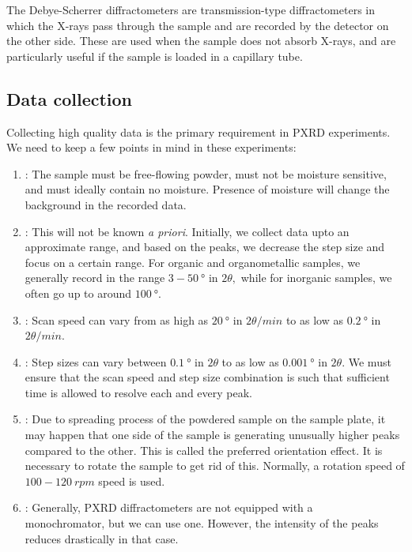 	The Debye-Scherrer diffractometers are transmission-type diffractometers in which the X-rays pass through the sample and are recorded by the detector on the other side. These are used when the sample does not absorb X-rays, and are particularly useful if the sample is loaded in a capillary tube.
	
\subsection{Data collection}

	Collecting high quality data is the primary requirement in PXRD experiments. We need to keep a few points in mind in these experiments:%
%		
		\begin{enumerate}%
%		
		    \item {}: The sample must be free-flowing powder, must not be moisture sensitive, and must ideally contain no moisture. Presence of moisture will change the background in the recorded data.
		    
		    \item {}: This will not be known \textit{a priori}. Initially, we collect data upto an approximate range, and based on the peaks, we decrease the step size and focus on a certain range. For organic and organometallic samples, we generally record in the range $3-50~\si{\degree}$ in $2\theta,$ while for inorganic samples, we often go up to around $\SI{100}{\degree}.$
		    
		    \item {}: Scan speed can vary from as high as $\SI{20}{\degree}$ in $\si{2\theta \per min}$ to as low as $\SI{0.2}{\degree}$ in $\si{2\theta \per min}.$
		    
		    \item {}: Step sizes can vary between $\SI{0.1}{\degree}$ in $2\theta$ to as low as $\SI{0.001}{\degree}$ in $2\theta.$ We must ensure that the scan speed and step size combination is such that sufficient time is allowed to resolve each and every peak.
		    
		    \item {}: Due to spreading process of the powdered sample on the sample plate, it may happen that one side of the sample is generating unusually higher peaks compared to the other. This is called the preferred orientation effect. It is necessary to rotate the sample to get rid of this. Normally, a rotation speed of $100-120~\si{rpm}$ speed is used.
		    
		    \item {}: Generally, PXRD diffractometers are not equipped with a \\monochromator, but we can use one. However, the intensity of the peaks reduces drastically in that case.
		    
		\end{enumerate}
		
